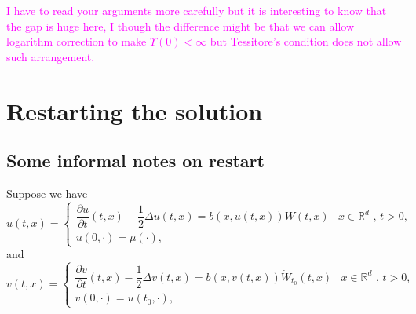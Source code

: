 \documentclass{article}
\numberwithin{equation}{section}
\newcommand{\R}{\mathbb{R}}
\begin{document}
\bigskip \textcolor{magenta}{I have to read your arguments more carefully but
it is interesting to know that the gap is huge here, I though the difference
might be that we can allow logarithm correction to make $\Upsilon(0)<\infty$
but Tessitore's condition does not allow such arrangement.}

\section{Restarting the solution}
\subsection{Some informal notes on restart}

Suppose we have
	\begin{equation} \label{E:SHE}
	u(t,x) =
	\begin{cases}
	\dfrac{\partial u}{\partial t}(t,x)-\dfrac{1}{2}\Delta u(t,x) = b(x,u(t,x))\dot W(t,x) & \text{$x\in \R^d$ , $t>0$}, \\
	u(0,\cdot) = \mu(\cdot),                                                               &
	\end{cases}
	\end{equation}
and
	\begin{equation} \label{E:SHErestart}
	v(t,x) =
	\begin{cases}
	\dfrac{\partial v}{\partial t}(t,x)-\dfrac{1}{2}\Delta v(t,x) = b(x,v(t,x))\dot W_{t_0}(t,x) & \text{$x\in \R^d$ , $t>0$}, \\
	v(0,\cdot) = u(t_0,\cdot)       ,                                                      &
	\end{cases}
	\end{equation}
\end{document}
